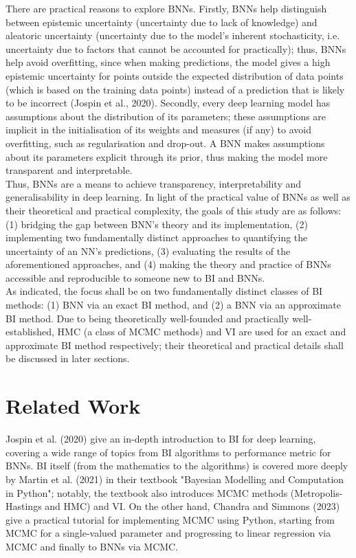 \documentclass[conference]{IEEEtran}
\begin{document}
There are practical reasons to explore BNNs. Firstly, BNNs help distinguish between epistemic uncertainty (uncertainty due to lack of knowledge) and aleatoric uncertainty (uncertainty due to the model's inherent stochasticity, i.e. uncertainty due to factors that cannot be accounted for practically); thus, BNNs help avoid overfitting, since when making predictions, the model gives a high epistemic uncertainty for points outside the expected distribution of data points (which is based on the training data points) instead of a prediction that is likely to be incorrect (Jospin et al., 2020). Secondly, every deep learning model has assumptions about the distribution of its parameters; these assumptions are implicit in the initialisation of its weights and measures (if any) to avoid overfitting, such as regularisation and drop-out. A BNN makes assumptions about its parameters explicit through its prior, thus making the model more transparent and interpretable.\\


Thus, BNNs are a means to achieve transparency, interpretability and generalisability in deep learning. In light of the practical value of BNNs as well as their theoretical and practical complexity, the goals of this study are as follows: (1) bridging the gap between BNN’s theory and its implementation, (2) implementing two fundamentally distinct approaches to quantifying the uncertainty of an NN's predictions, (3) evaluating the results of the aforementioned approaches, and (4) making the theory and practice of BNNs accessible and reproducible to someone new to BI and BNNs.\\

As indicated, the focus shall be on two fundamentally distinct classes of BI methods: (1) BNN via an exact BI method, and (2) a BNN via an approximate BI method. Due to being theoretically well-founded and practically well-established, HMC (a class of MCMC methods) and VI are used for an exact and approximate BI method respectively; their theoretical and practical details shall be discussed in later sections.\\

\section{Related Work}
Jospin et al. (2020) give an in-depth introduction to BI for deep learning, covering a wide range of topics from BI algorithms to performance metric for BNNs. BI itself (from the mathematics to the algorithms) is covered more deeply by Martin et al. (2021) in their textbook "Bayesian Modelling and Computation in Python"; notably, the textbook also introduces MCMC methods (Metropolis-Hastings and HMC) and VI. On the other hand, Chandra and Simmons (2023) give a practical tutorial for implementing MCMC using Python, starting from MCMC for a single-valued parameter and progressing to linear regression via MCMC and finally to BNNs via MCMC.\\
\end{document}

